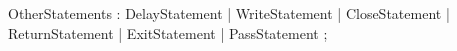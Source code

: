 %
%
%
\begin{rail}
OtherStatements : DelayStatement
                | WriteStatement
                | CloseStatement
                | ReturnStatement
                | ExitStatement
                | PassStatement
                ;
\end{rail}
